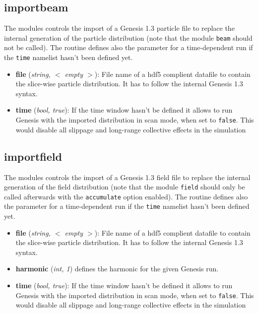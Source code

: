 \documentclass[12pt]{book}
\begin{document}
\subsection{\sf importbeam}
The modules controls the import of a Genesis 1.3 particle file to replace the internal generation of the particle distribution (note that the module {\tt beam} should not be called). The routine defines also the parameter for a time-dependent run if the {\tt time} namelist hasn't been defined yet. 
\begin{itemize}
\item{\bf file} ({\it string, $<$ empty $>$}): File name of a hdf5 complient datafile to contain the slice-wise particle distribution. It has to follow the internal Genesis 1.3 syntax.
\item{\bf time} ({\it bool, true}): If the time window hasn't be defined it allows to run Genesis with the imported distribution in scan mode, when set to {\tt false}. This would disable all slippage and long-range collective effects in the simulation
\end{itemize}

 
\subsection{\sf importfield}
The modules controls the import of a Genesis 1.3 field file to replace the internal generation of the field distribution (note that the module {\tt field} should only be called afterwards with the {\tt accumulate} option enabled). The routine defines also the parameter for a time-dependent run if the {\tt time} namelist hasn't been defined yet. 
\begin{itemize}
\item{\bf file} ({\it string, $<$ empty $>$}): File name of a hdf5 complient datafile to contain the slice-wise particle distribution. It has to follow the internal Genesis 1.3 syntax.
\item{\bf harmonic} ({\it  int, 1}) defines the harmonic for the given Genesis run.
\item{\bf time} ({\it bool, true}): If the time window hasn't be defined it allows to run Genesis with the imported distribution in scan mode, when set to {\tt false}. This would disable all slippage and long-range collective effects in the simulation
\end{itemize}

 
\end{document}
